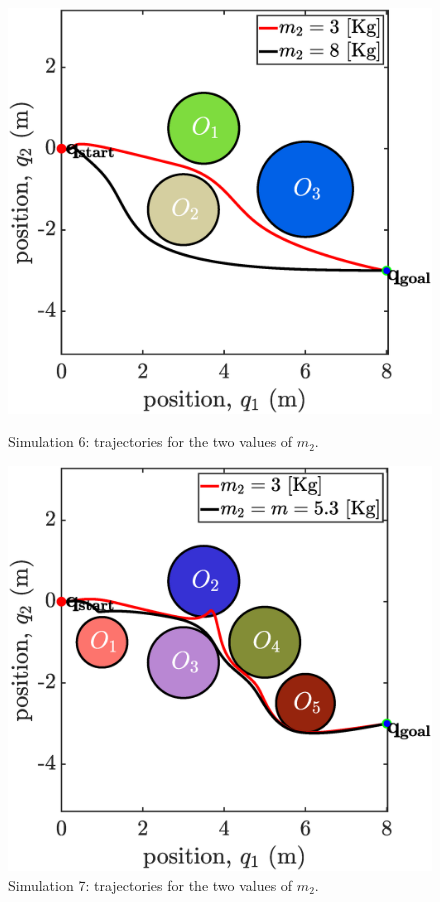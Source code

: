 \begin{figure}[!ht]
    \begin{minipage}[b]{0.45\linewidth}
    \includegraphics[width=\textwidth]{figures/sim6map.eps}
    \caption{\label{fig:sim6map}Simulation 6: trajectories for the two values of $m_2$.}
    \end{minipage}
    \hfill
    \begin{minipage}[b]{0.46\linewidth}
    \includegraphics[width=\textwidth]{figures/sim7map.eps}
    \caption{\label{fig:sim7map}Simulation 7: trajectories for the two values of $m_2$.}
    \end{minipage}
\end{figure}
